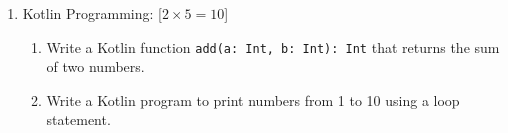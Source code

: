\documentclass[11pt,a4paper]{article}
\begin{document}
\begin{enumerate}[label=   \textbf{\arabic*.}]
    \item Kotlin Programming: \hfill [$2  \times 5 = 10$]
    
\begin{enumerate}[label=(\alph*)]
        \item Write a Kotlin function   \texttt{add(a: Int, b: Int): Int} that returns the sum of two numbers.
        \item Write a Kotlin program to print numbers from 1 to 10 using a loop statement.
    \end{enumerate}
\end{enumerate}
\end{document}
